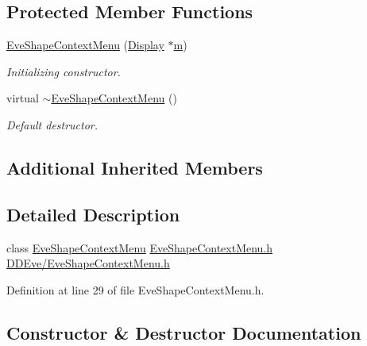 \subsection*{Protected Member Functions}
\begin{DoxyCompactItemize}
\item 
\hyperlink{class_d_d4hep_1_1_eve_shape_context_menu_a45482ef4f23d382d734b7a97c9f5ca22}{Eve\+Shape\+Context\+Menu} (\hyperlink{class_d_d4hep_1_1_display}{Display} $\ast$\hyperlink{_volumes_8cpp_a6fc379aaec47ce424b00d8ffda2a6c59}{m})
\begin{DoxyCompactList}\small\item\em Initializing constructor. \end{DoxyCompactList}\item 
virtual \hyperlink{class_d_d4hep_1_1_eve_shape_context_menu_a9e82222657b2932cbdaacf941ca68359}{$\sim$\+Eve\+Shape\+Context\+Menu} ()
\begin{DoxyCompactList}\small\item\em Default destructor. \end{DoxyCompactList}\end{DoxyCompactItemize}
\subsection*{Additional Inherited Members}


\subsection{Detailed Description}
class \hyperlink{class_d_d4hep_1_1_eve_shape_context_menu}{Eve\+Shape\+Context\+Menu} \hyperlink{_eve_shape_context_menu_8h}{Eve\+Shape\+Context\+Menu.\+h} \hyperlink{_eve_shape_context_menu_8h}{D\+D\+Eve/\+Eve\+Shape\+Context\+Menu.\+h} 

Definition at line 29 of file Eve\+Shape\+Context\+Menu.\+h.



\subsection{Constructor \& Destructor Documentation}
\hypertarget{class_d_d4hep_1_1_eve_shape_context_menu_a45482ef4f23d382d734b7a97c9f5ca22}{}\label{class_d_d4hep_1_1_eve_shape_context_menu_a45482ef4f23d382d734b7a97c9f5ca22} 
